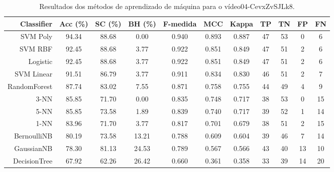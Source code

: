 \begin{table}[!htb]
\centering
\caption{Resultados dos métodos de aprendizado de máquina para o vídeo04-CevxZvSJLk8.}
\label{tab:04-CevxZvSJLk8}
\begin{tabular}{r|c|c|c|c|c|c|c|c|c|c}
\hline\hline
Classifier & Acc (\%) & SC (\%) & BH (\%) & F-medida & MCC & Kappa & TP & TN & FP & FN \\ \hline
SVM Poly & 94.34 & 88.68 & 0.00 & 0.940 & 0.893 & 0.887 & 47 & 53 & 0 & 6 \\ 
SVM RBF & 92.45 & 88.68 & 3.77 & 0.922 & 0.851 & 0.849 & 47 & 51 & 2 & 6 \\ 
Logistic & 92.45 & 88.68 & 3.77 & 0.922 & 0.851 & 0.849 & 47 & 51 & 2 & 6 \\ 
SVM Linear & 91.51 & 86.79 & 3.77 & 0.911 & 0.834 & 0.830 & 46 & 51 & 2 & 7 \\ 
RandomForest & 87.74 & 83.02 & 7.55 & 0.871 & 0.758 & 0.755 & 44 & 49 & 4 & 9 \\ 
3-NN & 85.85 & 71.70 & 0.00 & 0.835 & 0.748 & 0.717 & 38 & 53 & 0 & 15 \\ 
5-NN & 85.85 & 73.58 & 1.89 & 0.839 & 0.740 & 0.717 & 39 & 52 & 1 & 14 \\ 
1-NN & 83.96 & 71.70 & 3.77 & 0.817 & 0.701 & 0.679 & 38 & 51 & 2 & 15 \\ 
BernoulliNB & 80.19 & 73.58 & 13.21 & 0.788 & 0.609 & 0.604 & 39 & 46 & 7 & 14 \\ 
GaussianNB & 78.30 & 81.13 & 24.53 & 0.789 & 0.567 & 0.566 & 43 & 40 & 13 & 10 \\ 
DecisionTree & 67.92 & 62.26 & 26.42 & 0.660 & 0.361 & 0.358 & 33 & 39 & 14 & 20 \\ 
\hline\hline
\end{tabular}
\end{table}
